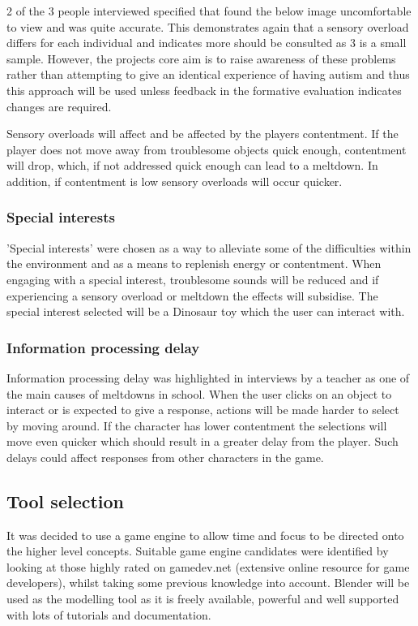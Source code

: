 \documentclass[11pt]{report}
\begin{document}
2 of the 3 people interviewed specified that found the below image uncomfortable to view and was quite accurate. This demonstrates again that a sensory overload differs for each individual and indicates more should be consulted as 3 is a small sample. However, the projects core aim is to raise awareness of these problems rather than attempting to give an identical experience of having autism and thus this approach will be used unless feedback in the formative evaluation indicates changes are required. 

Sensory overloads will affect and be affected by the players contentment. If the player does not move away from troublesome objects quick enough, contentment will drop, which, if not addressed quick enough can lead to a meltdown. In addition, if contentment is low sensory overloads will occur quicker. 

\subsubsection{Special interests}
'Special interests' were chosen as a way to alleviate some of the difficulties within the environment and as a means to replenish energy or contentment. When engaging with a special interest, troublesome sounds will be reduced and if experiencing a sensory overload or meltdown the effects will subsidise. The special interest selected will be a Dinosaur toy which the user can interact with.

\subsubsection{Information processing delay}
Information processing delay was highlighted in interviews by a teacher as one of the main causes of meltdowns in school. When the user clicks on an object to interact or is expected to give a response, actions will be made harder to select by moving around. If the character has lower contentment the selections will move even quicker which should result in a greater delay from the player. Such delays could affect responses from other characters in the game. 

\subsection{Tool selection}
It was decided to use a game engine to allow time and focus to be directed onto the higher level concepts. Suitable game engine candidates were identified by looking at those highly rated on gamedev.net (extensive online resource for game developers), whilst taking some previous knowledge into account. Blender will be used as the modelling tool as it is freely available, powerful and well supported with lots of tutorials and documentation.
\end{document}
